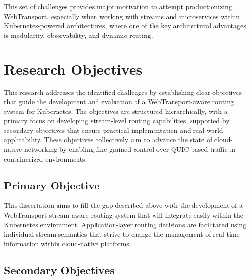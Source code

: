 This set of challenges provides major motivation to attempt productionizing WebTransport, especially when working with streams and microservices within Kubernetes-powered architectures, where one of the key architectural advantages is modularity, observability, and dynamic routing.

\section{Research Objectives}

This research addresses the identified challenges by establishing clear objectives that guide the development and evaluation of a WebTransport-aware routing system for Kubernetes. The objectives are structured hierarchically, with a primary focus on developing stream-level routing capabilities, supported by secondary objectives that ensure practical implementation and real-world applicability. These objectives collectively aim to advance the state of cloud-native networking by enabling fine-grained control over QUIC-based traffic in containerized environments.

\subsection{Primary Objective}

This dissertation aims to fill the gap described above with the development of a WebTransport stream-aware routing system that will integrate easily within the Kubernetes environment. Application-layer routing decisions are facilitated using individual stream semantics that strive to change the management of real-time information within cloud-native platforms.

\subsection{Secondary Objectives}

